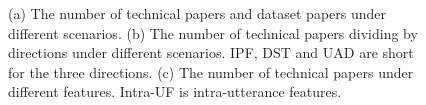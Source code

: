 \begin{figure}[ht]
{\begin{minipage}[t]{0.3\linewidth}
	\label{fig:tech-scenario}
	\end{minipage}}
\caption{(a) The number of technical papers and dataset papers under different scenarios. (b) The number of technical papers dividing by directions under different scenarios. IPF, DST and UAD are short for the three directions. (c) The number of technical papers under different features. Intra-UF is intra-utterance features.}
\end{figure}





